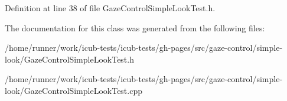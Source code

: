Definition at line 38 of file Gaze\+Control\+Simple\+Look\+Test.\+h.



The documentation for this class was generated from the following files\+:\begin{DoxyCompactItemize}
\item 
/home/runner/work/icub-\/tests/icub-\/tests/gh-\/pages/src/gaze-\/control/simple-\/look/Gaze\+Control\+Simple\+Look\+Test.\+h\item 
/home/runner/work/icub-\/tests/icub-\/tests/gh-\/pages/src/gaze-\/control/simple-\/look/Gaze\+Control\+Simple\+Look\+Test.\+cpp\end{DoxyCompactItemize}
